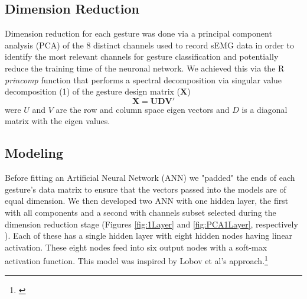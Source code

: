 \documentclass{article}
\begin{document}
\subsection{Dimension Reduction}

Dimension reduction for each gesture was done via a principal component analysis (PCA) of the 8 distinct channels used to record sEMG data in order to identify the most relevant channels for gesture classification and potentially  reduce the training time of the neuronal network. We achieved this via the R \textit{princomp} function that performs a spectral decomposition via singular value decomposition (1) of the gesture design matrix ($\mathbf{X}$)
\begin{equation}
\mathbf{X = U D V'}
\end{equation}
were $U$ and $V$ are the row and column space eigen vectors and $D$ is a diagonal matrix with the eigen values.

\subsection{Modeling}

Before fitting an Artificial Neural Network (ANN) we "padded" the ends of each gesture's data matrix to ensure that the vectors passed into the models are of equal dimension. We then developed two ANN with one hidden layer, the first with all components and a second with channels subset selected during the dimension reduction stage (Figures  \ref{fig:1Layer} and \ref{fig:PCA1Layer}, respectively ). Each of these has a single hidden layer with eight hidden nodes having linear activation. These eight nodes feed into six output nodes with a soft-max activation function. This model was inspired by Lobov et al's approach.\footnote{\cite{Sensorpaper}}
\end{document}
